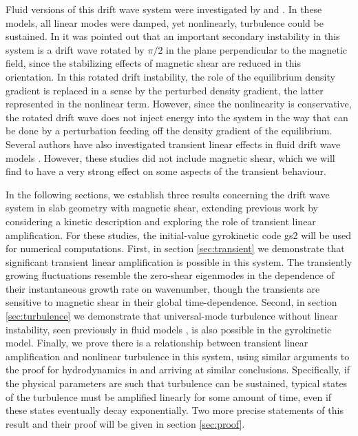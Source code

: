 \documentclass{jpp}
\begin{document}
Fluid versions of this drift wave system were investigated by \citet{Scott1,Scott2}
and \citet{Drake}.
In these models, all linear modes were damped, yet nonlinearly, turbulence could be sustained.
In \citet{Drake} it was pointed out that an important secondary
instability in this system is a drift wave rotated by $\pi/2$ in the plane
perpendicular to the magnetic field, since the stabilizing effects of magnetic
shear are reduced in this orientation.
In this rotated drift instability, the role of the equilibrium density gradient is replaced in a sense by the
perturbed density gradient, the latter represented in the nonlinear term.
However, since the nonlinearity is conservative, the rotated drift wave does not inject energy
into the system in the way that can be done by a perturbation feeding off the density gradient of the equilibrium.
Several authors have also investigated transient linear effects in fluid drift wave models
\citep{Camargo, Friedman1, Friedman2}. However, these studies did not
include magnetic shear, which we will find to have a very strong effect on
some aspects of the transient behaviour.

In the following sections, we establish three results concerning the drift wave system in slab geometry
with magnetic shear,
extending previous work by considering a kinetic description and exploring the role of transient linear amplification.
For these studies, the initial-value gyrokinetic code gs2 \citep{gs2} will be used
for numerical computations.
First, in section \ref{sec:transient} we demonstrate that
significant transient linear amplification is possible in this system.
The transiently growing fluctuations
resemble the zero-shear eigenmodes
in the dependence of their instantaneous growth rate on wavenumber,
though the transients are sensitive to magnetic shear
in their global time-dependence.
Second, in section \ref{sec:turbulence} we demonstrate that universal-mode turbulence without linear
instability, seen previously in fluid models  \citep{Scott1,Scott2,Drake},
is also possible in the gyrokinetic model.
Finally, we prove there is a relationship between
transient linear amplification and nonlinear turbulence in this system,
using similar arguments to the proof for hydrodynamics in \citet{DelSoleNecessity}
and arriving at similar conclusions.
Specifically, if the physical parameters are such that turbulence can be sustained,
typical states of the turbulence must be amplified linearly for some amount of time, even if these states
eventually decay exponentially.
Two more precise statements of this result and their proof will be given in section \ref{sec:proof}.
\end{document}
